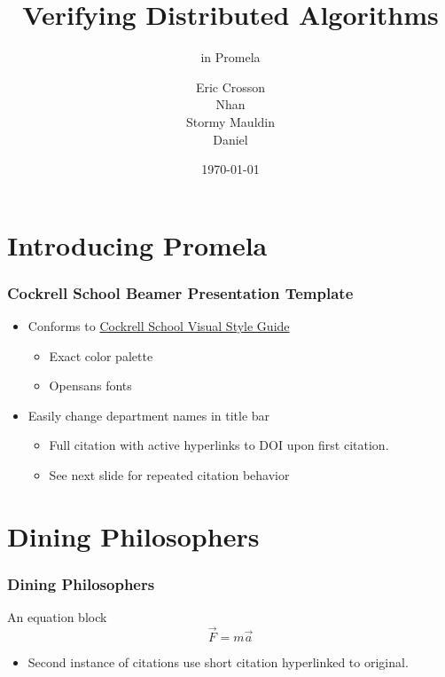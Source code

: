 \documentclass[t, pdftex]{beamer}
\title{Verifying Distributed Algorithms}
\subtitle{in Promela}
\author{Eric Crosson \\ Nhan \\ Stormy Mauldin \\ Daniel}
\institute{EE 360P}
\date{\today}
\begin{document}
\titleframe



\section{Introducing Promela}
\begin{frame}
    \frametitle{Cockrell School Beamer Presentation Template}

    \begin{itemize}
        \item Conforms to \href{http://www.engr.utexas.edu/communications/visualguidelines}{Cockrell School Visual Style Guide}
        \begin{itemize}
            \item Exact color palette
            \item Opensans fonts
        \end{itemize}
        \item Easily change department names in title bar
        \begin{itemize}
            \item Full citation with active hyperlinks to DOI upon first citation.
            \item See next slide for repeated citation behavior
        \end{itemize}
    \end{itemize}
\end{frame}

\section{Dining Philosophers}
\begin{frame}[c]
    \frametitle{Dining Philosophers}
    \begin{block}{An equation block}
        \[ \vec{F} = m \vec{a} \]
    \end{block}
    \begin{itemize}
        \item Second instance of citations use short citation hyperlinked to original.
    \end{itemize}
\end{frame}
\end{document}
